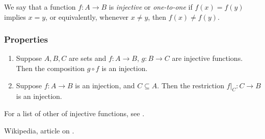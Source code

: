 \documentclass{article}
\begin{document}
We say that a function $f\colon A\to B$ is \emph{injective} or \emph{one-to-one} if $f(x)=f(y)$ implies $x=y$, or equivalently, whenever $x\neq y$, then $f(x)\neq f(y)$.

\subsubsection*{Properties}
\begin{enumerate}
\item Suppose $A,B,C$ are sets and $f\colon A\to B$, $g\colon B\to C$
are injective functions. Then the composition $g\circ f$ is an injection. 
\item Suppose $f\colon A\to B$ is an injection, and $C\subseteq A$. Then
the restriction $f|_C\colon C\to B$ is an injection.
\end{enumerate}

For a list of other  of 
injective functions, see \cite{wiki}. 

\begin{thebibliography}{9}
 Wikipedia, article on .
\end{thebibliography}
\end{document}
